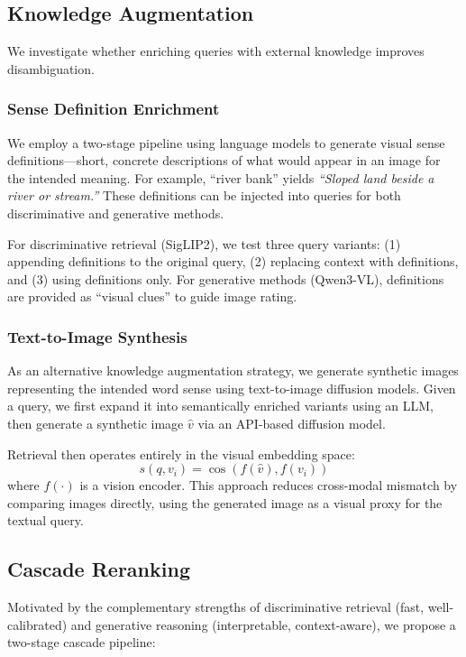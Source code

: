 \documentclass[11pt]{article}
\begin{document}
\subsection{Knowledge Augmentation}

We investigate whether enriching queries with external knowledge improves disambiguation.

\subsubsection{Sense Definition Enrichment}

We employ a two-stage pipeline using language models to generate visual sense definitions---short, concrete descriptions of what would appear in an image for the intended meaning. For example, ``river bank'' yields \textit{``Sloped land beside a river or stream.''} These definitions can be injected into queries for both discriminative and generative methods.

For discriminative retrieval (SigLIP2), we test three query variants: (1) appending definitions to the original query, (2) replacing context with definitions, and (3) using definitions only. For generative methods (Qwen3-VL), definitions are provided as ``visual clues'' to guide image rating.

\subsubsection{Text-to-Image Synthesis}

As an alternative knowledge augmentation strategy, we generate synthetic images representing the intended word sense using text-to-image diffusion models. Given a query, we first expand it into semantically enriched variants using an LLM, then generate a synthetic image $\hat{v}$ via an API-based diffusion model.

Retrieval then operates entirely in the visual embedding space:
\[
    s(q, v_i) = \cos\left(f(\hat{v}), f(v_i)\right)
\]
where $f(\cdot)$ is a vision encoder. This approach reduces cross-modal mismatch by comparing images directly, using the generated image as a visual proxy for the textual query.

\subsection{Cascade Reranking}

Motivated by the complementary strengths of discriminative retrieval (fast, well-calibrated) and generative reasoning (interpretable, context-aware), we propose a two-stage cascade pipeline:
\end{document}
